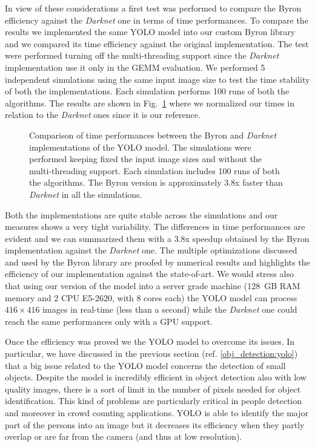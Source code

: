 \documentclass{standalone}
\begin{document}
In view of these considerations a first test was performed to compare the \textsf{Byron} efficiency against the \emph{Darknet} one in terms of time performances.
To compare the results we implemented the same YOLO model into our custom \textsf{Byron} library and we compared its time efficiency against the original implementation.
The test were performed turning off the multi-threading support since the \emph{Darknet} implementation use it only in the GEMM evaluation.
We performed 5 independent simulations using the same input image size to test the time stability of both the implementations.
Each simulation performs 100 runs of both the algorithms.
The results are shown in Fig.~\ref{fig:yolo_time} where we normalized our times in relation to the \emph{Darknet} ones since it is our reference.

\begin{figure}[htbp]
\centering
\def\svgwidth{0.85\textwidth}

\caption{Comparison of time performances between the \textsf{Byron} and \emph{Darknet} implementations of the YOLO model.
The simulations were performed keeping fixed the input image sizes and without the multi-threading support.
Each simulation includes 100 runs of both the algorithms.
The \textsf{Byron} version is approximately 3.8x faster than \emph{Darknet} in all the simulations.
}
\label{fig:yolo_time}
\end{figure}

Both the implementations are quite stable across the simulations and our measures shows a very tight variability.
The differences in time performances are evident and we can summarized them with a 3.8x speedup obtained by the \textsf{Byron} implementation against the \emph{Darknet} one.
The multiple optimizations discussed and used by the \textsf{Byron} library are proofed by numerical results and highlights the efficiency of our implementation against the state-of-art.
We would stress also that using our version of the model into a server grade machine (128~GB RAM memory and 2 CPU E5-2620, with 8 cores each) the YOLO model can process $416\times416$ images in real-time (less than a second) while the \emph{Darknet} one could reach the same performances only with a GPU support.

Once the efficiency was proved we  the YOLO model to overcome its issues.
In particular, we have discussed in the previous section (ref. \ref{obj_detection:yolo}) that a big issue related to the YOLO model concerns the detection of small objects.
Despite the model is incredibly efficient in object detection also with low quality images, there is a sort of limit in the number of pixels needed for object identification.
This kind of problems are particularly critical in people detection and moreover in crowd counting applications.
YOLO is able to identify the major part of the persons into an image but it decreases its efficiency when they partly overlap or are far from the camera (and thus at low resolution).
\end{document}
